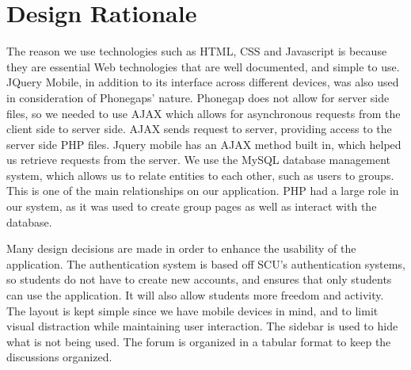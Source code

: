 \chapter{Design Rationale}
The reason we use technologies such as HTML, CSS and Javascript is because they are essential Web technologies that are well documented, and simple to use. JQuery Mobile, in addition to its interface across different devices, was also used in consideration of Phonegaps' nature. Phonegap does not allow for server side files, so we needed to use AJAX which allows for asynchronous requests from the client side to server side. AJAX sends request to server, providing access to the server side PHP files. Jquery mobile has an AJAX method  built in, which helped us retrieve requests from the server. We use the MySQL database management system, which allows us to relate entities to each other, such as users to groups. This is one of the main relationships on our application. PHP had a large role in our system, as it was used to create group pages as well as interact with the database.

Many design decisions are made in order to enhance the usability of the application. The authentication system is based off SCU’s authentication systems, so students do not have to create new accounts, and ensures that only students can use the application. It will also allow students more freedom and activity. The layout is kept simple since we have mobile devices in mind, and to limit visual distraction while maintaining user interaction. The sidebar is used to hide what is not being used. The forum is organized in a tabular format to keep the discussions organized.